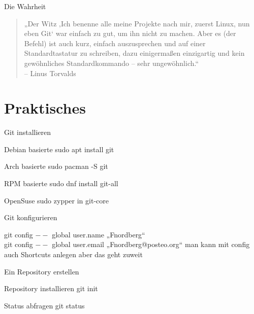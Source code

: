\documentclass{beamer}
\begin{document}
\begin{frame}{Die Wahrheit}
     \begin{quote}
        „Der Witz ‚Ich benenne alle meine Projekte nach mir, zuerst Linux, nun eben Git‘ war einfach zu gut, um ihn nicht zu machen. 
        Aber es (der Befehl) ist auch kurz, einfach auszusprechen und auf einer Standardtastatur zu schreiben, dazu einigermaßen 
        einzigartig und kein gewöhnliches Standardkommando – sehr ungewöhnlich.“ \\
	    – Linus Torvalds
     \end{quote}

\end{frame}

\section{Praktisches}

\begin{frame}{Git installieren}
    
    \begin{block}{Debian basierte}
        sudo apt install git
    \end{block}
    
    \begin{block}{Arch basierte}
        sudo pacman -S git
    \end{block}
    
    \begin{block}{RPM basierte}
         sudo dnf install git-all  
    \end{block}
    
    \begin{block}{OpenSuse}
        sudo zypper in git-core       
    \end{block}

\end{frame}

\begin{frame}{Git konfigurieren}
    
    git config $- -$ global user.name „Fnordberg“ \\
    git config $- -$ global user.email „Fnordberg@posteo.org“ 
    \newline
    \newline
    man kann mit config auch Shortcuts anlegen aber das geht zuweit
    
\end{frame}

\begin{frame}{Ein Repository erstellen}
    
    \begin{block}{Repository installieren}
     git init
    \end{block}
    
    \begin{block}{Status abfragen}
     git status
    \end{block}
    
\end{frame}
\end{document}
